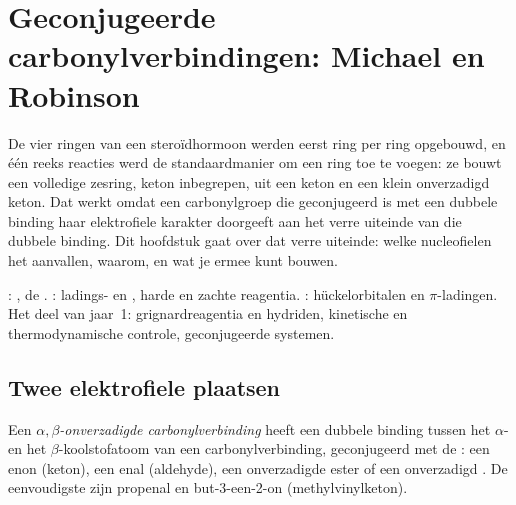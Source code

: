 \chapter{Geconjugeerde carbonylverbindingen: Michael en Robinson}\label{ch:b2:conjugate-additions}

De vier ringen van een steroïdhormoon werden eerst ring per ring opgebouwd, en één reeks
reacties werd de standaardmanier om een ring toe te voegen: ze bouwt een volledige zesring, keton
inbegrepen, uit een keton en een klein onverzadigd keton. Dat werkt omdat een carbonylgroep die geconjugeerd is
met een dubbele binding  haar elektrofiele karakter doorgeeft aan het verre uiteinde van die dubbele binding.
Dit hoofdstuk gaat over dat verre uiteinde: welke nucleofielen het aanvallen, waarom, en wat je ermee kunt bouwen.

\begin{recall}
: , de . :
ladings- en , harde en zachte reagentia. : hückelorbitalen en $\pi$-ladingen.
Het deel van jaar~1: grignardreagentia en hydriden, kinetische en thermodynamische controle, geconjugeerde
systemen.
\end{recall}

\section{Twee elektrofiele plaatsen}

\begin{definition}\label{def:b2:conjugate-additions:enone}
Een \emph{$\alpha,\beta$-onverzadigde carbonylverbinding}
heeft een dubbele binding  tussen het $\alpha$-
en het $\beta$-koolstofatoom van een carbonylverbinding, geconjugeerd met de : een enon (keton), een enal
(aldehyde), een onverzadigde ester of een onverzadigd . De eenvoudigste zijn propenal  en
but-3-een-2-on  (methylvinylketon).
\end{definition}

